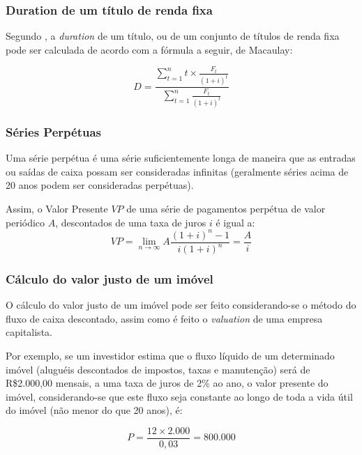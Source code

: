 \documentclass[
	12pt,				%
	oneside,			%
	a4paper,			%
	chapter=TITLE,		%
	section=TITLE,		%
	english,			%
	brazil				%
	]{abntex2}
\begin{document}
\hypertarget{duration-de-um-tuxedtulo-de-renda-fixa}{%
\subsubsection{Duration de um título de renda fixa}\label{duration-de-um-tuxedtulo-de-renda-fixa}}

Segundo \textcite{marins1}, a \emph{duration} de um título, ou de um conjunto de títulos de
renda fixa pode ser calculada de acordo com a fórmula a seguir, de Macaulay:

\[D = \frac{\sum_{t = 1}^{n} t \times \frac{F_t}{(1+i)^t}}{\sum_{t = 1}^{n} \frac{F_t}{(1+i)^t}}\]

\hypertarget{suxe9ries-perpuxe9tuas}{%
\subsubsection{Séries Perpétuas}\label{suxe9ries-perpuxe9tuas}}

Uma série perpétua é uma série suficientemente longa de maneira que as entradas
ou saídas de caixa possam ser consideradas infinitas (geralmente séries acima de
20 anos podem ser consideradas perpétuas).

Assim, o Valor Presente \(VP\) de uma série de pagamentos perpétua de valor
periódico \(A\), descontados de uma taxa de juros \(i\) é igual a:
\begin{equation}
VP = \lim_{n \to \infty} A \frac{(1+i)^n-1}{i(1+i)^n}= \frac{A}{i}
\label{eq:perpetua}
\end{equation}
\hypertarget{cuxe1lculo-do-valor-justo-de-um-imuxf3vel}{%
\subsubsection{Cálculo do valor justo de um imóvel}\label{cuxe1lculo-do-valor-justo-de-um-imuxf3vel}}

O cálculo do valor justo de um imóvel pode ser feito considerando-se o método
do fluxo de caixa descontado, assim como é feito o \emph{valuation} de uma empresa
capitalista.

Por exemplo, se um investidor estima que o fluxo líquido de um determinado
imóvel (aluguéis descontados de impostos, taxas e manutenção) será de R\$2.000,00
mensais, a uma taxa de juros de 2\% ao ano, o valor presente do imóvel,
considerando-se que este fluxo seja constante ao longo de toda a vida útil do
imóvel (não menor do que 20 anos), é:

\[P = \frac{12 \times 2.000}{0,03} = 800.000\]
\end{document}
